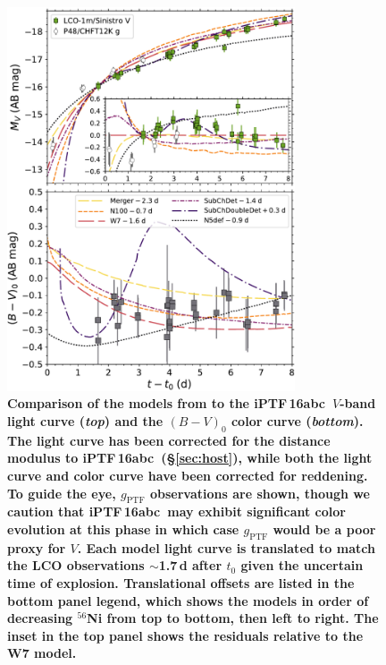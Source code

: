 \documentclass[twocolumn]{aastex61}
\newcommand{\abc}{iPTF\,16abc}
\begin{document}
\begin{figure}[]
  \centering
  \includegraphics[width=3.35in]{compare_Noebauer.pdf}
  \caption{
  \textbf{Comparison of the models from \citet{2017MNRAS.472.2787N} to the
  \abc\ $V$-band light curve (\textit{top}) and the $(B-V)_0$ color curve
  (\textit{bottom}). The light curve has been corrected for the distance
  modulus to \abc\ (\S\ref{sec:host}), while both the light curve and color
  curve have been corrected for reddening. To guide the eye,
  $g_\mathrm{PTF}$ observations are shown, though we caution
  that \abc\ may exhibit significant color evolution at this phase in which
  case $g_\mathrm{PTF}$ would be a poor proxy for $V$. Each model light curve
  is translated to match the LCO observations $\sim$1.7\,d after $t_0$ given
  the uncertain time of explosion. Translational offsets are listed in the
  bottom panel legend, which shows the models in order of decreasing
  $^{56}$Ni from top to bottom, then left to right. The inset in
  the top panel shows the residuals relative to the W7 model.} }
  \label{fig:noebauer} 
\end{figure}
\end{document}
